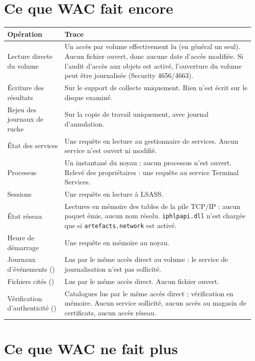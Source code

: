 \documentclass[11pt,a4paper,oneside]{report}
\begin{document}
\section{Ce que WAC fait encore}

\begin{longtable}{@{}L{4.3cm}L{10.1cm}@{}}
\toprule
\bfseries Opération & \bfseries Trace \\
\midrule
\endhead
Lecture directe du volume & Un accès par volume effectivement lu (en général un
  seul). Aucun fichier ouvert, donc aucune date d'accès modifiée. Si l'audit
  d'accès aux objets est activé, l'ouverture du volume peut être journalisée
  (Security 4656/4663). \\
Écriture des résultats & Sur le support de collecte uniquement. Rien n'est écrit
  sur le disque examiné. \\
Rejeu des journaux de ruche & Sur la copie de travail uniquement, avec journal
  d'annulation. \\
État des services & Une requête en lecture au gestionnaire de services. Aucun
  service n'est ouvert ni modifié. \\
Processus & Un instantané du noyau ; aucun processus n'est ouvert. Relevé des
  propriétaires : une requête au service Terminal Services. \\
Sessions & Une requête en lecture à LSASS. \\
État réseau & Lectures en mémoire des tables de la pile TCP/IP : aucun paquet
  émis, aucun nom résolu. \texttt{iphlpapi.dll} n'est chargée que si
  \texttt{artefacts.network} est activé. \\
Heure de démarrage & Une requête en mémoire au noyau. \\
Journaux d'événements () & Lus par le même accès direct au volume :
  le service de journalisation n'est pas sollicité. \\
Fichiers cités () & Lus par le même accès direct. Aucun fichier
  ouvert. \\
Vérification d'authenticité () & Catalogues lus par le même accès
  direct ; vérification en mémoire. Aucun service sollicité, aucun accès au
  magasin de certificats, aucun accès réseau. \\
\bottomrule
\end{longtable}

\section{Ce que WAC ne fait plus}
\end{document}
